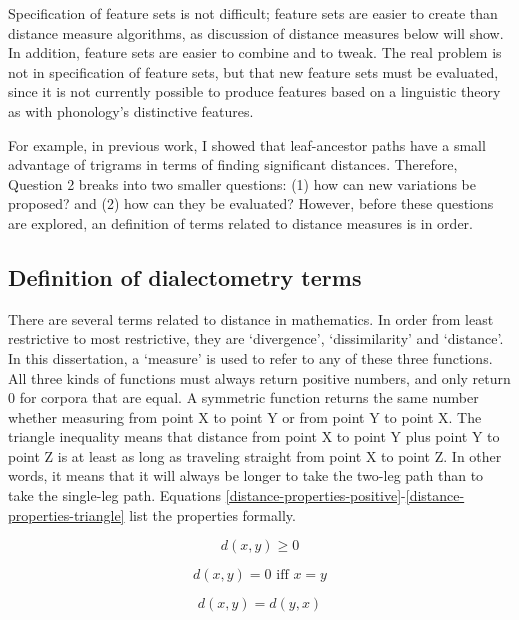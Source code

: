 Specification of feature sets is not difficult; feature sets are
easier to create than distance measure algorithms, as discussion of
distance measures below will show. In addition, feature sets are
easier to combine and to tweak. The real problem is not in
specification of feature sets, but that new feature sets must be
evaluated, since it is not currently possible to produce features
based on a linguistic theory as with phonology's distinctive features.

For example, in previous work, I showed that leaf-ancestor paths have
a small advantage of trigrams \cite{sanders07} in terms of finding
significant distances. Therefore, Question 2 breaks into two smaller
questions: (1) how can new variations be proposed? and (2) how can
they be evaluated? However, before these questions are explored, an
definition of terms related to distance measures is in order.

\subsection{Definition of dialectometry terms}

There are several terms related to distance in mathematics. In order
from least restrictive to most restrictive, they are `divergence',
`dissimilarity' and `distance'. In this dissertation, a `measure' is
used to refer to any of these three functions.  All three kinds of
functions must always return positive numbers, and only return 0 for
corpora that are equal.  A symmetric function returns the same number
whether measuring from point X to point Y or from point Y to point
X. The triangle inequality means that distance from point X to point Y
plus point Y to point Z is at least as long as traveling straight from
point X to point Z.  In other words, it means that it will always be
longer to take the two-leg path than to take the single-leg
path. Equations
\ref{distance-properties-positive}-\ref{distance-properties-triangle}
list the properties formally.

\begin{equation}
  d(x,y) \ge 0
  \label{distance-properties-positive}
\end{equation}

\begin{equation}
 d(x,y) = 0 \textrm{ iff } x=y
 \label{distance-properties-eqq}
\end{equation}

\begin{equation}
  d(x,y) = d(y,x)
\end{equation}

